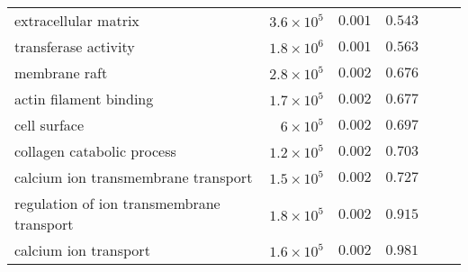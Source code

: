 \documentclass{article}
\begin{document}
\begin{longtable}{|l|r|r|r|r|r|}
                      extracellular matrix & $3.6\times 10^{5}$ &             $ 0.001$ &                     $ 0.543~~$ \\
                      transferase activity & $1.8\times 10^{6}$ &             $ 0.001$ &                     $ 0.563~~$ \\
                             membrane raft & $2.8\times 10^{5}$ &             $ 0.002$ &                     $ 0.676~~$ \\
                    actin filament binding & $1.7\times 10^{5}$ &             $ 0.002$ &                     $ 0.677~~$ \\
                              cell surface &  $ 6\times 10^{5}$ &             $ 0.002$ &                     $ 0.697~~$ \\
                collagen catabolic process & $1.2\times 10^{5}$ &             $ 0.002$ &                     $ 0.703~~$ \\
       calcium ion transmembrane transport & $1.5\times 10^{5}$ &             $ 0.002$ &                     $ 0.727~~$ \\
 regulation of ion transmembrane transport & $1.8\times 10^{5}$ &             $ 0.002$ &                     $ 0.915~~$ \\
                     calcium ion transport & $1.6\times 10^{5}$ &             $ 0.002$ &                     $ 0.981~~$ \\
\end{longtable}
\end{document}
